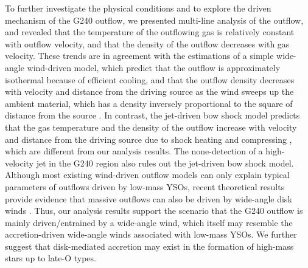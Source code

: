 To further investigate the physical conditions and to explore the driven mechanism of the G240 outflow, we presented multi-line analysis of the outflow, and revealed that the temperature of the outflowing gas is relatively constant with outflow velocity, and that the density of the outflow decreases with gas velocity. These trends are in agreement with the estimations of a simple wide-angle wind-driven model, which predict that the outflow is approximately isothermal because of efficient cooling, and that the outflow density decreases with velocity and distance from the driving source as the wind sweeps up the ambient material, which has a density inversely proportional to the square of distance from the source \citep{1991ApJ...370L..31S, 2001ApJ...557..429L}. In contrast, the jet-driven bow shock model predicts that the gas temperature and the density of the outflow increase with velocity and distance from the driving source due to shock heating and compressing \citep{2001ApJ...557..429L}, which are different from our analysis results. The none-detection of a high-velocity jet in the G240 region also rules out the jet-driven bow shock model. Although most existing wind-driven outflow models can only explain typical parameters of outflows driven by low-mass YSOs, recent theoretical results provide evidence that massive outflows can also be driven by wide-angle disk winds \citep{2018MNRAS.475..391M}. Thus, our analysis results support the scenario that the G240 outflow is mainly driven/entrained by a wide-angle wind, which itself may resemble the accretion-driven wide-angle winds \citep[X-wind or disk winds:][]{2006ApJ...649..845S, 2006MNRAS.365.1131P} associated with low-mass YSOs. We further suggest that disk-mediated accretion may exist in the formation of high-mass stars up to late-O types. 

